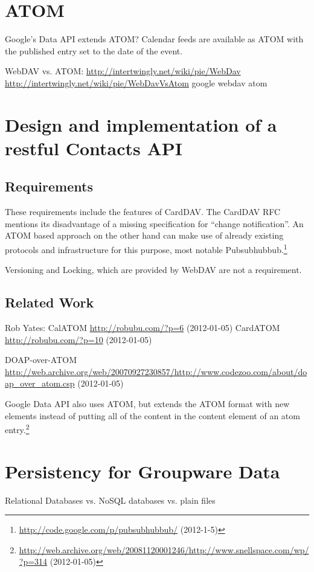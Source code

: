 \documentclass[12pt,a4paper]{scrartcl}		%
\newcommand{\citeurl}[2]{\url{#1} (#2)}
\begin{document}
\section{ATOM}

Google's Data API extends ATOM?
Calendar feeds are available as ATOM with the published entry set to the date of the event.

WebDAV vs. ATOM:
\url{http://intertwingly.net/wiki/pie/WebDav}
\url{http://intertwingly.net/wiki/pie/WebDavVsAtom}
google webdav atom

\section{Design and implementation of a restful Contacts API}

\subsection{Requirements}
These requirements include the features of CardDAV.\cite[sec. 1]{RFC6352} The
CardDAV RFC mentions its disadvantage of a missing specification for ``change
notification''. An ATOM based approach on the other hand can make use of already existing protocols and infrastructure for this purpose, most notable Pubsubhubbub.\footnote{\citeurl{http://code.google.com/p/pubsubhubbub/}{2012-1-5}}

Versioning and Locking, which are provided by WebDAV are not a requirement.

\subsection{Related Work}

Rob Yates:
CalATOM \citeurl{http://robubu.com/?p=6}{2012-01-05}
CardATOM \citeurl{http://robubu.com/?p=10}{2012-01-05}


DOAP-over-ATOM \citeurl{http://web.archive.org/web/20070927230857/http://www.codezoo.com/about/doap_over_atom.csp}{2012-01-05}

Google Data API also uses ATOM, but extends the ATOM format with new elements instead of putting all of the content in the content element of an atom entry.\footnote{\citeurl{http://web.archive.org/web/20081120001246/http://www.snellspace.com/wp/?p=314}{2012-01-05}}

\section{Persistency for Groupware Data}
Relational Databases vs. NoSQL databases vs. plain files
\end{document}
